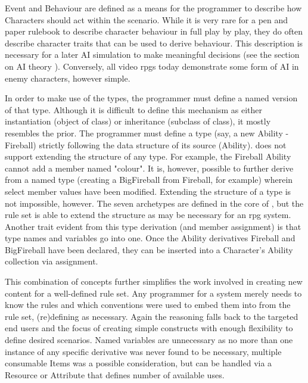 Event and Behaviour are defined as a means for the programmer to describe how Characters should act within the scenario. While it is very rare for a pen and paper rulebook to describe character behaviour in full play by play, they do often describe character traits that can be used to derive behaviour. This description is necessary for a later AI simulation to make meaningful decisions (see the section on AI theory ). Conversely, all video \ac{rpgs} today demonstrate some form of AI in enemy characters, however simple.

In order to make use of the types, the programmer must define a named version of that type. Although it is difficult to define this mechanism as either instantiation (object of class) or inheritance (subclass of class), it mostly resembles the prior. The programmer must define a type (say, a new Ability - Fireball) strictly following the data structure of its source (Ability). \langname{} does not support extending the structure of any type. For example, the Fireball Ability cannot add a member named "colour". It is, however, possible to further derive from a named type (creating a BigFireball from Fireball, for example) wherein select member values have been modified. Extending the structure of a type is not impossible, however. The seven archetypes are defined in the core of \langname{}, but the rule set is able to extend the structure as may be necessary for an \ac{rpg} system. Another trait evident from this type derivation (and member assignment) is that type names and variables go into one. Once the Ability derivatives Fireball and BigFireball have been declared, they can be inserted into a Character's Ability collection via assignment.

This combination of concepts further simplifies the work involved in creating new content for a well-defined rule set. Any \langname{} programmer for a system merely needs to know the rules and which conventions were used to embed them into \langname{} from the rule set, (re)defining as necessary.
Again the reasoning falls back to the targeted end users and the focus of creating simple constructs with enough flexibility to define desired scenarios. Named variables are unnecessary as no more than one instance of any specific derivative was never found to be necessary, multiple consumable Items was a possible consideration, but can be handled via a Resource or Attribute that defines number of available uses.
